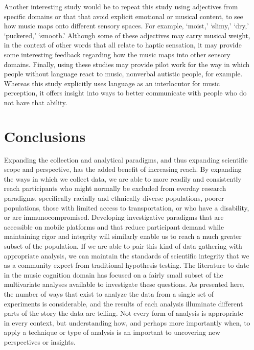 \documentclass[
  english,
  man,floatsintext]{apa6}
\begin{document}
Another interesting study would be to repeat this study using adjectives from specific domains or that that avoid explicit emotional or musical content, to see how music maps onto different sensory spaces. For example, `moist,' `slimy,' `dry,' `puckered,' `smooth.' Although some of these adjectives may carry musical weight, in the context of other words that all relate to haptic sensation, it may provide some interesting feedback regarding how the music maps into other sensory domains.
Finally, using these studies may provide pilot work for the way in which people without language react to music, nonverbal autistic people, for example. Whereas this study explicitly uses language as an interlocutor for music perception, it offers insight into ways to better communicate with people who do not have that ability.

\hypertarget{conclusions}{%
\section{Conclusions}\label{conclusions}}

Expanding the collection and analytical paradigms, and thus expanding scientific scope and perspective, has the added benefit of increasing reach. By expanding the ways in which we collect data, we are able to more readily and consistently reach participants who might normally be excluded from everday research paradigms, specifically racially and ethnically diverse populations, poorer populations, those with limited access to transportation, or who have a disability, or are immunocompromised. Developing investigative paradigms that are accessible on mobile platforms and that reduce participant demand while maintaining rigor and integrity will similarly enable us to reach a much greater subset of the population. If we are able to pair this kind of data gathering with appropriate analysis, we can maintain the standards of scientific integrity that we as a community expect from traditional hypothesis testing. The literature to date in the music cognition domain has focused on a fairly small subset of the multivariate analyses available to investigate these questions. As presented here, the number of ways that exist to analyze the data from a single set of experiments is considerable, and the results of each analysis illuminate different parts of the story the data are telling. Not every form of analysis is appropriate in every context, but understanding how, and perhaps more importantly when, to apply a technique or type of analysis is an important to uncovering new perspectives or insights.
\end{document}
